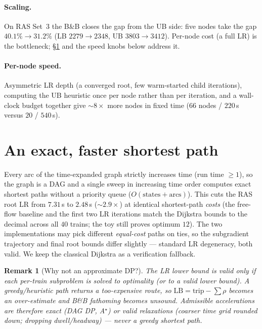 \documentclass[11pt]{article}
\newtheorem{remark}{Remark}
\begin{document}
\paragraph{Scaling.} On RAS Set~3 the B\&B closes the gap from the UB side: five nodes take
the gap $40.1\%\!\to\!31.2\%$ (LB $2279\!\to\!2348$, UB $3803\!\to\!3412$). Per-node cost
(a full LR) is the bottleneck; \S\ref{sec:dag} and the speed knobs below address it.

\paragraph{Per-node speed.} Asymmetric LR depth (a converged root, few warm-started child
iterations), computing the UB heuristic once per node rather than per iteration, and a
wall-clock budget together give $\sim\!8\times$ more nodes in fixed time ($66$ nodes / $220$\,s
versus $20$ / $540$\,s).

\section{An exact, faster shortest path}\label{sec:dag}
Every arc of the time-expanded graph strictly increases time (run time $\ge 1$), so the graph
is a DAG and a single sweep in increasing time order computes exact shortest paths without a
priority queue ($O(\text{states}+\text{arcs})$). This cuts the RAS root LR from $7.31$\,s to
$2.48$\,s ($\sim\!2.9\times$) at identical shortest-path \emph{costs} (the free-flow baseline
and the first two LR iterations match the Dijkstra bounds to the decimal across all $40$
trains; the toy still proves optimum $12$). The two implementations may pick different
\emph{equal-cost} paths on ties, so the subgradient trajectory and final root bounds differ
slightly --- standard LR degeneracy, both valid. We keep the classical Dijkstra as a
verification fallback.

\begin{remark}[Why not an approximate DP?]
The LR lower bound is valid only if each per-train subproblem is solved to optimality (or to a
valid lower bound). A greedy/heuristic path returns a \emph{too-expensive} route, so
$\mathrm{LB}=\text{trip}-\sum\rho$ becomes an over-estimate and B\&B fathoming becomes
unsound. Admissible accelerations are therefore exact (DAG DP, A$^\star$) or valid
\emph{relaxations} (coarser time grid rounded down; dropping dwell/headway) --- never a
greedy shortest path.
\end{remark}
\end{document}

